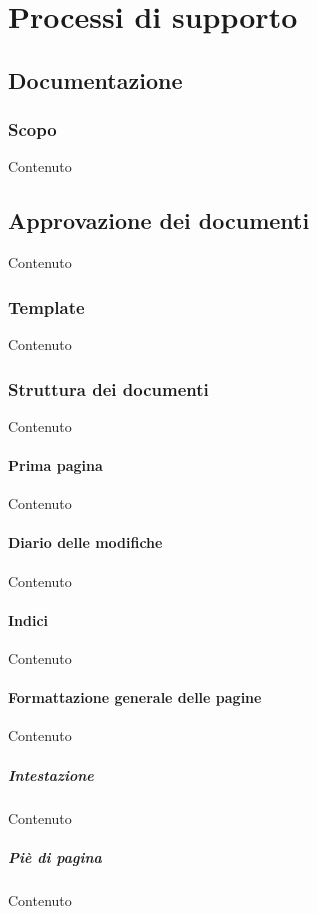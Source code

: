 \section{Processi di supporto}

\subsection{Documentazione}

    \subsubsection{Scopo}
    Contenuto

\subsection{Approvazione dei documenti}
Contenuto

    \subsubsection{Template}
    Contenuto

    \subsubsection{Struttura dei documenti}
    Contenuto

    \paragraph{Prima pagina}
    Contenuto

    \paragraph{Diario delle modifiche}
    Contenuto

    \paragraph{Indici}
    Contenuto


    \paragraph{Formattazione generale delle pagine}
    Contenuto

    \subparagraph{Intestazione}
    Contenuto

    \subparagraph{Pi\`e di pagina}
    Contenuto


